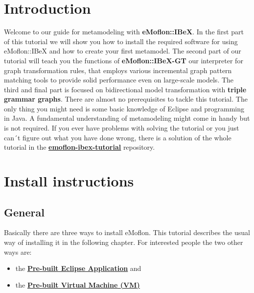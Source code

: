 \section{Introduction}
Welcome to our guide for metamodeling with \textbf{eMoflon::IBeX}. In the first part of this tutorial we will show you how to install the required software for using eMoflon::IBeX and how to create your first metamodel.\newline
The second part of our tutorial will teach you the functions of \textbf{eMoflon::IBeX-GT} our interpreter for graph transformation rules, that employs various incremental graph pattern matching tools to provide solid performance even on large-scale models.\newline
The third and final part is focused on bidirectional model transformation with \textbf{triple grammar graphs}.\newline
There are almost no prerequisites to tackle this tutorial. The only thing you might need is some basic knowledge of Eclipse and programming in Java. A fundamental understanding of metamodeling might come in handy but is not required. \newline
If you ever have problems with solving the tutorial or you just can´t figure out what you have done wrong, there is a solution of the whole tutorial in the \textbf{\underline{\href{https://github.com/eMoflon/emoflon-ibex-tutorial}{emoflon-ibex-tutorial}}} repository.

\section{Install instructions}

\raggedright

\subsection{General}

Basically there are three ways to install eMoflon. This tutorial describes the usual way of installing it in the following chapter. For interested people the two other ways are:
\begin{itemize}
	\item the \underline{\textbf{\href{https://www.emoflon.org/download/\#pre-built-eclipse-application}{Pre-built Eclipse Application}}} and
	\item the \underline{\textbf{\href{https://www.emoflon.org/download/\#pre-built-virtual-machine-vm}{Pre-built Virtual Machine (VM)}}}
\end{itemize}

